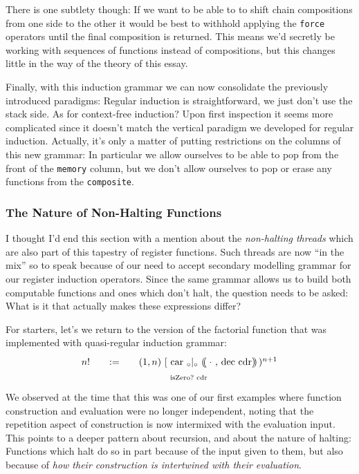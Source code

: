\documentclass[twoside]{article}
\newcommand{\qdefeq}{\ensuremath{\quad :=\quad}}
\newcommand{\doublechar}[2]{#2\hspace{#1}#2}
\newcommand{\shiftedchar}[3]{\hspace{#1}\raisebox{#2}{#3}}
\newcommand{\after}[1]{\hspace{#1}}
\newcommand{\ldp}{\ensuremath{
\doublechar{-0.5ex}{(}
\shiftedchar{-0.35ex}{1.00ex}{$\scriptscriptstyle \bar{ }$}
\shiftedchar{-0ex}{-1.25ex}{$\scriptscriptstyle \bar{ }$}
\after{0.55ex}
}}
\newcommand{\rdp}{\ensuremath{
\doublechar{-0.5ex}{)}
\shiftedchar{-1.00ex}{1.00ex}{$\scriptscriptstyle \bar{ }$}
\shiftedchar{-0ex}{-1.25ex}{$\scriptscriptstyle \bar{ }$}
\after{0.95ex}
}}
\newcommand{\car}{\mbox{car}}
\newcommand{\cdr}{\mbox{cdr}}
\newcommand{\dec}{\mbox{dec}}
\newcommand{\isZero}{\mbox{isZero?}}
\begin{document}
There is one subtlety though: If we want to be able to to shift chain compositions from one side to the other it would be best
to withhold applying the \texttt{force} operators until the final composition is returned. This means we'd secretly be working
with sequences of functions instead of compositions, but this changes little in the way of the theory of this essay.

Finally, with this induction grammar we can now consolidate the previously introduced paradigms: Regular induction
is straightforward, we just don't use the stack side. As for context-free induction? Upon first inspection it seems
more complicated since it doesn't match the vertical paradigm we developed for regular induction. Actually, it's only
a matter of putting restrictions on the columns of this new grammar: In particular we allow ourselves to be able to
pop from the front of the \texttt{memory} column, but we don't allow ourselves to pop or erase any functions from the
\texttt{composite}.

\subsubsection*{The Nature of Non-Halting Functions}

I thought I'd end this section with a mention about the \emph{non-halting threads} which are also part of this tapestry
of register functions. Such threads are now ``in the mix'' so to speak because of our need to accept secondary modelling
grammar for our register induction operators. Since the same grammar allows us to build both computable functions and
ones which don't halt, the question needs to be asked: What is it that actually makes these expressions differ?

For starters, let's we return to the version of the factorial function
that was implemented with quasi-regular induction grammar:
$$ \def\arraystretch{1.2}
\begin{array}{rcl}
n! & \qdefeq	& (1,n)\ [\ \car\ _\circ|_\circ\ \ldp\,\cdot\ ,\,\dec\ \cdr\rdp\,)^{n+1}		\\
   &		& \hspace{7.5ex}\scriptsize \isZero\ \cdr
\end{array} $$
We observed at the time that this was one of our first examples where function construction and evaluation were
no longer independent, noting that the repetition aspect of construction is now intermixed with the evaluation input.
This points to a deeper pattern about recursion, and about the nature of halting: Functions which halt do so in part
because of the input given to them, but also because of \emph{how their construction is intertwined with their evaluation}.
\end{document}
